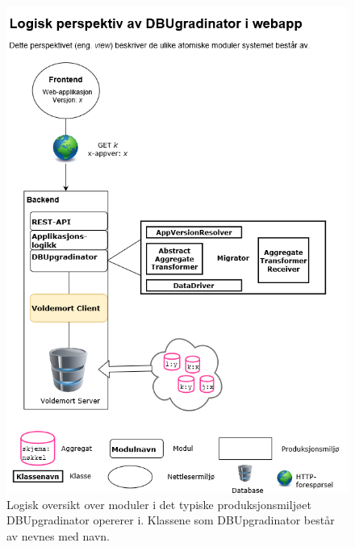 \begin{figure}[!ht]
    \centering
    \includegraphics[scale=0.5]{fig/dbupgradinator-logisk-1.png}
    \caption{Logisk oversikt over moduler i det typiske produksjonsmiljøet DBUpgradinator opererer i. Klassene som DBUpgradinator består av nevnes med navn.}
    \label{fig5}
\end{figure}

\newpage

